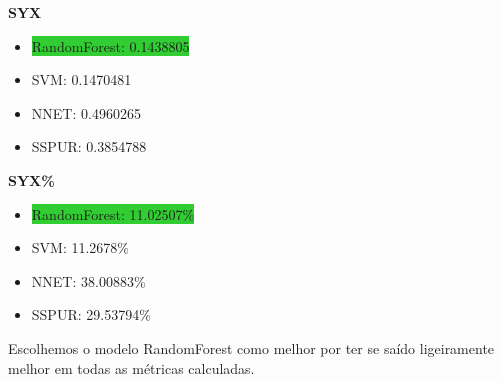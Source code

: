 \begin{adjustwidth}{1.5em}{}
\textbf{SYX}
\end{adjustwidth}
\begin{itemize}
    \item \colorbox{LimeGreen}{RandomForest: 0.1438805} \FancyUpDown
    \item SVM: 0.1470481
    \item NNET: 0.4960265 \FancyUpDown
    \item SSPUR: 0.3854788 \FancyUpArrow 
\end{itemize}

\begin{adjustwidth}{1.5em}{}
\textbf{SYX\%}
\end{adjustwidth}
\begin{itemize}
    \item \colorbox{LimeGreen}{RandomForest: 11.02507\%} \FancyUpDown
    \item SVM: 11.2678\%
    \item NNET: 38.00883\% \FancyUpDown
    \item SSPUR: 29.53794\% \FancyUpArrow 
\end{itemize}


Escolhemos o modelo RandomForest como melhor por ter se saído ligeiramente melhor em todas as métricas calculadas.